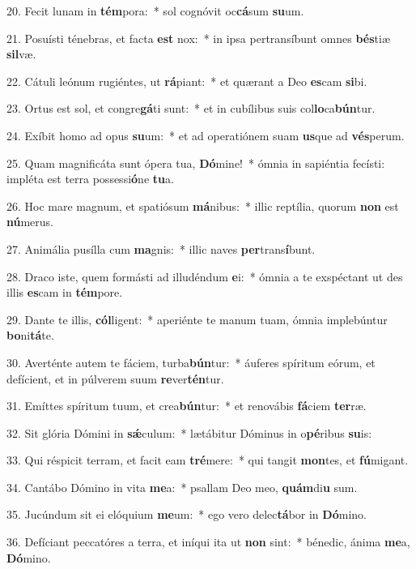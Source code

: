 20. Fecit lunam in \textbf{tém}pora:~*  sol cognóvit oc\textbf{cá}sum \textbf{su}um.\

21. Posuísti ténebras, et facta \textbf{est} nox:~*  in ipsa pertransíbunt omnes \textbf{bés}tiæ \textbf{sil}væ.\

22. Cátuli leónum rugiéntes, ut \textbf{rá}piant:~*  et quærant a Deo \textbf{es}cam \textbf{si}bi.\

23. Ortus est sol, et congre\textbf{gá}ti sunt:~*  et in cubílibus suis col\textbf{lo}ca\textbf{bún}tur.\

24. Exíbit homo ad opus \textbf{su}um:~*  et ad operatiónem suam \textbf{us}que ad \textbf{vés}perum.\

25. Quam magnificáta sunt ópera tua, \textbf{Dó}mine!~*  ómnia in sapiéntia fecísti: impléta est terra possessi\textbf{ó}ne \textbf{tu}a.\

26. Hoc mare magnum, et spatiósum \textbf{má}nibus:~*  illic reptília, quorum \textbf{non} est \textbf{nú}merus.\

27. Animália pusílla cum \textbf{ma}gnis:~*  illic naves \textbf{per}trans\textbf{í}bunt.\

28. Draco iste, quem formásti ad illudéndum \textbf{e}i:~*  ómnia a te exspéctant ut des illis \textbf{es}cam in \textbf{tém}pore.\

29. Dante te illis, \textbf{cól}ligent:~*  aperiénte te manum tuam, ómnia implebúntur \textbf{bo}ni\textbf{tá}te.\

30. Averténte autem te fáciem, turba\textbf{bún}tur:~*  áuferes spíritum eórum, et defícient, et in púlverem suum \textbf{re}ver\textbf{tén}tur.\

31. Emíttes spíritum tuum, et crea\textbf{bún}tur:~*  et renovábis \textbf{fá}ciem \textbf{ter}ræ.\

32. Sit glória Dómini in \textbf{sǽ}culum:~*  lætábitur Dóminus in o\textbf{pé}ribus \textbf{su}is:\

33. Qui réspicit terram, et facit eam \textbf{tré}mere:~*  qui tangit \textbf{mon}tes, et \textbf{fú}migant.\

34. Cantábo Dómino in vita \textbf{me}a:~*  psallam Deo meo, \textbf{quám}di\textbf{u} sum.\

35. Jucúndum sit ei elóquium \textbf{me}um:~*  ego vero delec\textbf{tá}bor in \textbf{Dó}mino.\

36. Defíciant peccatóres a terra, et iníqui ita ut \textbf{non} sint:~*  bénedic, ánima \textbf{me}a, \textbf{Dó}mino.\

